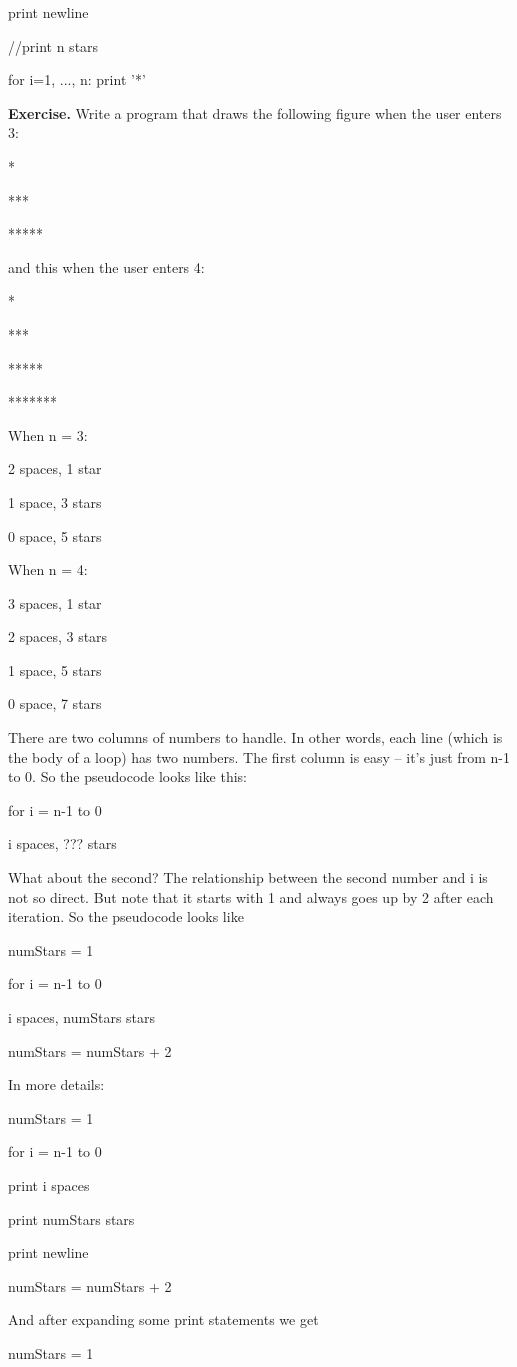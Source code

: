 \documentclass[
]{article}
\begin{document}
print newline

//print n stars

for i=1, ..., n: print '*'

\textbf{Exercise.} Write a program that draws the following figure when
the user enters 3:

*

***

*****

and this when the user enters 4:

*

***

*****

*******

When n = 3:

2 spaces, 1 star

1 space, 3 stars

0 space, 5 stars

When n = 4:

3 spaces, 1 star

2 spaces, 3 stars

1 space, 5 stars

0 space, 7 stars

There are two columns of numbers to handle. In other words, each line
(which is the body of a loop) has two numbers. The first column is easy
-- it's just from n-1 to 0. So the pseudocode looks like this:

for i = n-1 to 0

i spaces, ??? stars

What about the second? The relationship between the second number and i
is not so direct. But note that it starts with 1 and always goes up by 2
after each iteration. So the pseudocode looks like

numStars = 1

for i = n-1 to 0

i spaces, numStars stars

numStars = numStars + 2

In more details:

numStars = 1

for i = n-1 to 0

print i spaces

print numStars stars

print newline

numStars = numStars + 2

And after expanding some print statements we get

numStars = 1
\end{document}
